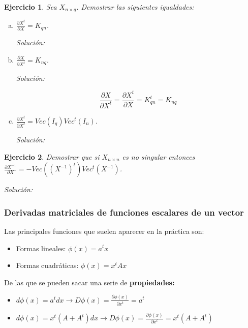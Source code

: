 \documentclass{article}
\theoremstyle{theorem-style}  %
\theoremstyle{definition-style}
\theoremstyle{example-style}
\theoremstyle{exercise-style}
\newtheorem{exercise}{Ejercicio}[section]
\begin{document}
	\begin{exercise}
		Sea $X_{n\times q}$. Demostrar las siguientes igualdades:
		\begin{enumerate}[a)]
			\item $\displaystyle \frac{\partial X^t}{\partial X} = K_{qn}$.
			
			\textit{Solución:} 
			
			\item $\displaystyle \frac{\partial X}{\partial X^t} = K_{nq}$.
			
			\textit{Solución:}
			
			
			$$\displaystyle \frac{\partial X}{\partial X^t} = \displaystyle \frac{\partial X^t}{\partial X} = K_{qn}^t=K_{nq}$$
			
			\item $\displaystyle \frac{\partial X^t}{\partial X^t} = Vec(I_q)Vec^t(I_n)$.
			
			\textit{Solución:}
			
			
			
		\end{enumerate}
	\end{exercise}
	
	\begin{exercise}
		Demostrar que si $X_{n\times n}$ es no singular entonces $\displaystyle \frac{\partial X^{-1}}{\partial X} = -Vec((X^{-1})^t)Vec^t(X^{-1})$.
	\end{exercise}
	\textit{Solución:}
	
	\subsubsection{Derivadas matriciales de funciones escalares de un vector}
	
	Las principales funciones que suelen aparecer en la práctica son:
	
	\begin{itemize}
		\item Formas lineales: $\phi(x)=a^tx$
		\item Formas cuadráticas: $\phi(x)=x^tAx$
	\end{itemize}
	
	De las que se pueden sacar una serie de \textbf{propiedades:}
	
	\begin{itemize}
		\item $d\phi(x) = a^tdx \rightarrow D\phi(x) = \frac{\partial \phi(x)}{\partial x^t} = a^t$
		\item $d\phi(x) = x^t(A+A^t)dx \rightarrow D\phi(x) = \frac{\partial \phi(x)}{\partial x^t} = x^t(A+A^t)$
		
	\end{itemize}
	
\end{document}
